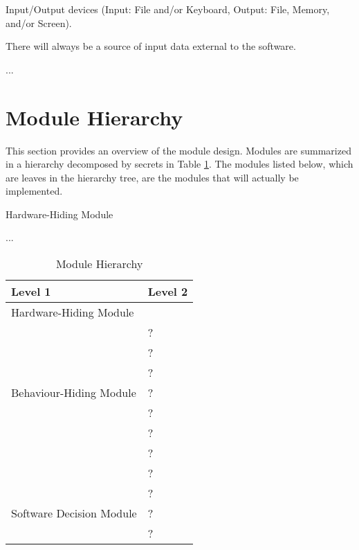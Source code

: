 \documentclass[12pt, titlepage]{article}
\newcounter{ucnum}
\newcommand{\uctheucnum}{UC\theucnum}
\newcounter{mnum}
\newcommand{\mthemnum}{M\themnum}
\begin{document}
\begin{description}
\item[ \uctheucnum \label{ucIO}:] Input/Output devices
  (Input: File and/or Keyboard, Output: File, Memory, and/or Screen).
\item[ \uctheucnum \label{ucInput}:] There will always be
  a source of input data external to the software.
\item ...
\end{description}

\section{Module Hierarchy} \label{SecMH}
This section provides an overview of the module design. Modules are summarized
in a hierarchy decomposed by secrets in Table \ref{TblMH}. The modules listed
below, which are leaves in the hierarchy tree, are the modules that will
actually be implemented.

\begin{description}
\item [ \mthemnum \label{mHH}:] Hardware-Hiding Module
\item ...
\end{description}


\begin{table}[h!]
\centering
\begin{tabular}{p{} p{}}
\toprule
\textbf{Level 1} & \textbf{Level 2}\\
\midrule

{Hardware-Hiding Module} & ~ \\
\midrule

\multirow{7}{0.3\textwidth}{Behaviour-Hiding Module} & ?\\
& ?\\
& ?\\
& ?\\
& ?\\
& ?\\
& ?\\ 
& ?\\
\midrule

\multirow{3}{0.3\textwidth}{Software Decision Module} & {?}\\
& ?\\
& ?\\
\bottomrule

\end{tabular}
\caption{Module Hierarchy}
\label{TblMH}
\end{table}
\end{document}
